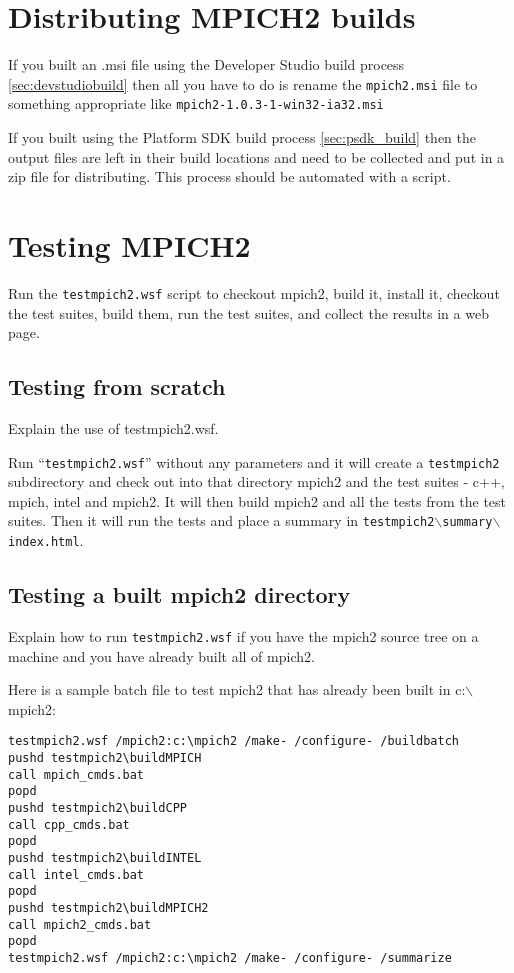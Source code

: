 \documentclass[dvipdfm,11pt]{article}
\begin{document}
\section{Distributing MPICH2 builds}
\label{sec:distribute}

If you built an .msi file using the Developer Studio build process \ref{sec:devstudiobuild} then
all you have to do is rename the \texttt{mpich2.msi} file to something appropriate like
\texttt{mpich2-1.0.3-1-win32-ia32.msi}

If you built using the Platform SDK build process \ref{sec:psdk_build} then the output files
are left in their build locations and need to be collected and put in a zip file for
distributing.  This process should be automated with a script.

\section{Testing MPICH2}
\label{sec:testing}

Run the \texttt{testmpich2.wsf} script to checkout mpich2, build it, install it, checkout 
the test suites, build them, run the test suites, and collect the results in a web page.

\subsection{Testing from scratch}
Explain the use of testmpich2.wsf.

Run ``\texttt{testmpich2.wsf}'' without any parameters and it will create a \texttt{testmpich2}
subdirectory and check out into that directory mpich2 and the test suites - c++, mpich, intel
and mpich2.  It will then build mpich2 and all the tests from the test suites.  Then it will run
the tests and place a summary in \texttt{testmpich2$\backslash$summary$\backslash$index.html}.

\subsection{Testing a built mpich2 directory}
Explain how to run \texttt{testmpich2.wsf} if you have the mpich2 source tree on a machine and you 
have already built all of mpich2.

Here is a sample batch file to test mpich2 that has already been built in c:$\backslash$mpich2:
\begin{verbatim}
testmpich2.wsf /mpich2:c:\mpich2 /make- /configure- /buildbatch
pushd testmpich2\buildMPICH
call mpich_cmds.bat
popd
pushd testmpich2\buildCPP
call cpp_cmds.bat
popd
pushd testmpich2\buildINTEL
call intel_cmds.bat
popd
pushd testmpich2\buildMPICH2
call mpich2_cmds.bat
popd
testmpich2.wsf /mpich2:c:\mpich2 /make- /configure- /summarize
\end{verbatim}
\end{document}

